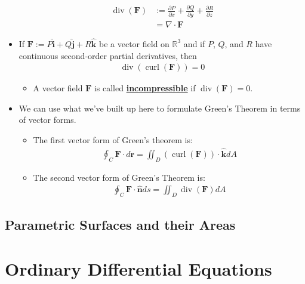 \documentclass[11pt]{article}
\newcommand{\dfn}[1]{\underline{\textbf{#1}}}
\newcommand{\R}[0]{\mathbb{R}}
\begin{document}
\begin{itemize}[noitemsep]
	\begin{align}
		\operatorname{div}(\mathbf{F}) & := \frac{\partial P}{\partial x} + \frac{\partial Q}{\partial y} + \frac{\partial R}{\partial z}	\\
			& = \nabla \cdot \mathbf{F} 
	\end{align}
	\item If $\mathbf{F} := P \hat{\mathbf{i}} + Q \hat{\mathbf{j}} + R \hat{\mathbf{k}}$ be a vector field on $\R^3$ and if $P$, $Q$, and $R$ have continuous second-order partial derivatives, then 
	\begin{align}
		\operatorname{div}( \operatorname{curl}(\mathbf{F})) = 0 	
	\end{align}
	\begin{itemize}[noitemsep]
		\item A vector field $\mathbf{F}$ is called \dfn{incompressible} if $\operatorname{div}(\mathbf{F}) =0$. 
	\end{itemize}
	\item We can use what we've built up here to formulate Green's Theorem in terms of vector forms. 
	\begin{itemize}[noitemsep]	
		\item The first vector form of Green's theorem is: 
		\begin{align}
			\oint_C \mathbf{F} \cdot d \mathbf{r} 	= \iint_D ( \operatorname{curl}(\mathbf{F})) \cdot \mathbf{\hat{k}} d A 
		\end{align}
		\item The second vector form of Green's Theorem is: 
		\begin{align}
			\oint_C \mathbf{F} \cdot \mathbf{\hat{n}}	ds = \iint_D \operatorname{div}(\mathbf{F}) dA
		\end{align}
	\end{itemize}
\end{itemize}

\subsection{Parametric Surfaces and their Areas}

\section{Ordinary Differential Equations}
\end{document}

